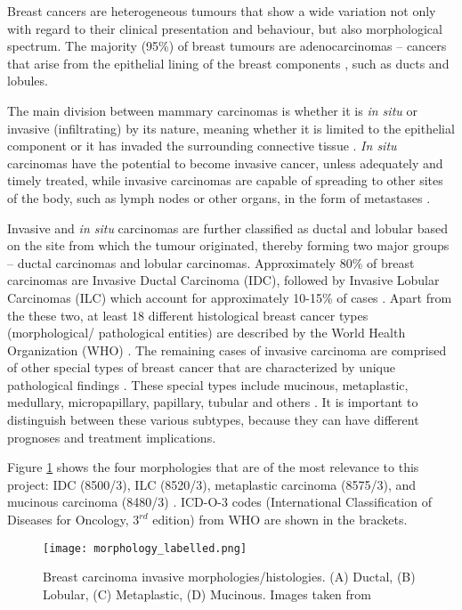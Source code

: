    
   Breast cancers are heterogeneous tumours that show a wide variation not only with regard to their clinical presentation and behaviour, but also morphological spectrum. The majority (95\%) of breast tumours are adenocarcinomas -- cancers that arise from the epithelial lining of the breast components \cite{Makki2015DiversityRelevance}, such as ducts and lobules.

    The main division between mammary carcinomas is whether it is \textit{in situ} or invasive (infiltrating) by its nature, meaning whether it is limited to the epithelial component or it has invaded the surrounding connective tissue \cite{Weigelt2008RefinementTypes}. \textit{In situ} carcinomas have the potential to become invasive cancer, unless adequately and timely treated, while invasive carcinomas are capable of spreading to other sites of the body, such as lymph nodes or other organs, in the form of metastases \cite{Makki2015DiversityRelevance}.

    Invasive and \textit{in situ} carcinomas are further classified as ductal and lobular based on the site from which the tumour originated, thereby forming two major groups --  ductal carcinomas and lobular carcinomas. Approximately 80\% of breast carcinomas are Invasive Ductal Carcinoma (IDC), followed by Invasive Lobular Carcinomas (ILC) which account for approximately 10-15\% of cases \cite{Weigelt2008RefinementTypes}. Apart from the these two, at least 18 different histological breast cancer types (morphological/ pathological entities) are described by the World Health Organization (WHO) \cite{walker2005world, 2011InternationalEd.}. The remaining cases of invasive carcinoma are comprised of other special types of breast cancer that are characterized by unique pathological findings \cite{Makki2015DiversityRelevance}. These special types include mucinous, metaplastic, medullary, micropapillary, papillary, tubular and others \cite{Weigelt2008RefinementTypes}. It is important to distinguish between these various subtypes, because they can have different prognoses and treatment implications.

    Figure \ref{fig:histology} shows the four morphologies that are of the most relevance to this project: IDC (8500/3), ILC (8520/3), metaplastic carcinoma (8575/3), and mucinous carcinoma (8480/3) \cite{Gathani2005BreastProgramme}. ICD-O-3 codes (International Classification of Diseases for Oncology, $3^{rd}$ edition) from WHO are shown in the brackets. 

   
            \begin{figure}[!h]
            \centering
            \texttt{[image: morphology\_labelled.png]}
            \caption[Breast carcinoma invasive morphologies/histologies.]{Breast carcinoma invasive morphologies/histologies. (A) Ductal, (B) Lobular, (C) Metaplastic, (D) Mucinous. Images taken from \cite{Ramnani2016Webpathology.com:Images, Abdelmessieh2016BreastOverview}}
            \label{fig:histology}
            \end{figure} 
    
